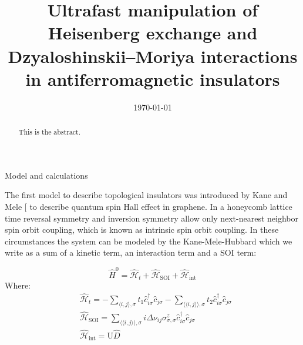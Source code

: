 \documentclass[aps,prl,twocolumn,amsmath,amssymb,superscriptaddress,nobibnotes]{revtex4}%
\renewcommand{\cite}[1]{{[}\onlinecite{#1}{]}}
\begin{document}
\title{Ultrafast manipulation of Heisenberg exchange and Dzyaloshinskii–Moriya interactions in antiferromagnetic insulators}


\begin{abstract}
This is the abstract.
\end{abstract}

\date{\today}
\maketitle

\begin{section}{Model and calculations}

The first model to describe topological insulators was introduced by Kane and Mele \cite{Kane2005} to describe quantum spin Hall effect in graphene. In a honeycomb lattice time reversal symmetry and inversion symmetry allow only next-nearest neighbor spin orbit coupling, which is known as intrinsic spin orbit coupling. In these circumstances the system can be modeled by the Kane-Mele-Hubbard which we write as a sum of a kinetic term, an interaction term and a SOI term:

\begin{equation}
\label{MKMH}
\hat{H}^0 = \hat{\mathcal{H}}_t + \hat{\mathcal{H}}_{\text{SOI}} + \hat{\mathcal{H}}_{\text{int}}
\end{equation}
Where:
\begin{align}
&\hat{\mathcal{H}}_t = - \sum_{\langle i,j \rangle, \sigma} t_1\hat{c}_{i \sigma}^\dagger \hat{c}_{j \sigma} - \sum_{\langle \langle i,j \rangle \rangle, \sigma} t_2\hat{c}_{i \sigma}^\dagger \hat{c}_{j \sigma} \\
&\hat{\mathcal{H}}_{\text{SOI}} = \sum_{\langle \langle i,j \rangle \rangle, \sigma} i\Delta\nu_{ij}\sigma^z_{\sigma, \sigma}\hat{c}_{i \sigma}^\dagger \hat{c}_{j \sigma} \\
&\hat{\mathcal{H}}_{\text{int}} = \text{U}\hat{D}
\end{align}


\end{section}
\end{document}
